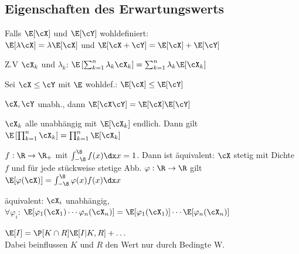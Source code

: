 \subsection{Eigenschaften des Erwartungswerts}
\shorttheorem[Linearität] Falls $\E[\cX]$ und $\E[\cY]$ wohldefiniert:\\
$\E[\lambda \cX] = \lambda \E[\cX]$ und $\E[\cX + \cY] = \E[\cX] + \E[\cY]$

\shortremark Z.V $\cX_k$ und $\lambda_k$: $\E\left[ \sum_{k = 1}^{n} \lambda_k \cX_k \right] = \sum_{k = 1}^{n} \lambda_k \E[\cX_k]$

\shorttheorem[Monotonie] Sei $\cX \leq \cY$ mit $\E$ wohldef.: $\E[\cX] \leq \E[\cY]$

\shorttheorem $\cX, \cY$ unabh., dann $\E[\cX \cY] = \E[\cX] \E[\cY]$

\shorttheorem $\cX_k$ alle unabhängig mit $\E[\cX_k]$ endlich. Dann gilt\\
$\E\left[ \prod_{k = 1}^n \cX_k \right] = \prod_{k = 1}^n \E[\cX_k]$

\shorttheorem $f : \R \rightarrow \R_+$ mit $\int_{-\8}^{\8} f(x) \dx x = 1$. Dann ist äquivalent:
 $\cX$ stetig mit Dichte $f$ und  für jede stückweise stetige Abb. $\varphi : \R \rightarrow \R$ gilt $\E[\varphi(\cX)] = \int_{-\8}^{\8} \varphi(x) f(x) \dx x$

\shorttheorem äquivalent:  $\cX_i$ unabhängig,\\
 $\forall \varphi_i$: $\E[\varphi_1(\cX_1) \cdots \varphi_n(\cX_n)] = \E[\varphi_1(\cX_1)] \cdots \E[\varphi_n(\cX_n)]$

\shortremark[Bedingte W.] $\E[I] = \P[K \cap R]\E[I | K, R] + \ldots$\\
{\scriptsize Dabei beinflussen $K$ und $R$ den Wert nur durch Bedingte W.}
